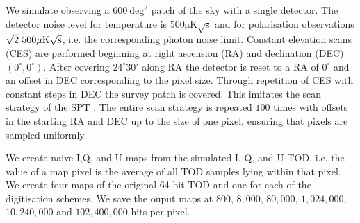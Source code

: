 \documentclass[apj]{emulateapj}
\begin{document}

We simulate observing a $600 \> \mathrm{ deg^2}$ patch of the sky with a single detector. The detector noise level for temperature is $500 \mathrm{\mu K \sqrt{s}}$ and for polarisation observations $\sqrt{2} \hspace{0.7ex} 500 \mathrm{\mu K \sqrt{s}}$, i.e. the corresponding photon noise limit. Constant elevation scans (CES) are performed beginning at right ascension (RA) and declination (DEC) $(0^\circ, 0^\circ)$. After covering $24^\circ30'$ along RA the detector is reset to a RA of $0^\circ$ and an offset in DEC corresponding to the pixel size. Through repetition of CES with constant steps in DEC the survey patch is covered. This imitates the scan strategy of the SPT \citep{schaffer2011}. The entire scan strategy is repeated $100$ times with offsets in the starting RA and DEC up to the size of one pixel, ensuring that pixels are sampled uniformly.

We create naive I,Q, and U maps from the simulated I, Q, and U TOD, i.e. the value of a map pixel is the average of all TOD samples lying within that pixel. We create four maps of the original 64 bit TOD and one for each of the digitisation schemes. We save the ouput maps at $800$, $8,000$, $80,000$, $1,024,000$, $10,240,000$ and $102,400,000$ hits per pixel.


\end{document}
